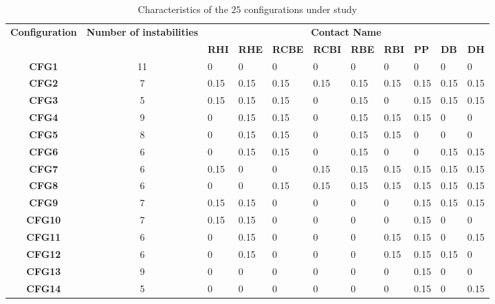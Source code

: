 \documentclass[final,1p]{elsarticle}
\begin{document}
\begin{table}[h!]
\centering
\caption{Characteristics of the $25$ configurations under study}
\small
\hspace*{-3.5cm}
\begin{tabularx}{20cm}{cc*{9}{X}}
\toprule
\multirow{2}{*}{\textbf{Configuration}} &\multirow{2}{2cm}{\textbf{Number of instabilities}} & \multicolumn{9}{c}{\textbf{Contact Name}} \\
 & & 	\textbf{RHI}		&\textbf{RHE}		&\textbf{RCBE}		& \textbf{RCBI}	& 	\textbf{RBE}	& 	\textbf{RBI}		&\textbf{PP}	&\textbf{DB}		&\textbf{ DH} \\
\midrule
\textbf{CFG1}				& 11											&0						&0						&0						&0					&0					&0						&0						&0			&0		\\
\textbf{CFG2}				& 7											&0.15					&0.15					&0.15					&0.15				&0.15				&0.15					&0.15					&0.15		&0.15	\\
\textbf{CFG3}				& 5											&0.15					&0.15					&0.15					&0					&0.15				&0						&0.15					&0.15		&0.15	\\
\textbf{CFG4}				& 9											&0						&0.15					&0.15					&0					&0.15				&0.15					&0.15					&0			&0		\\
\textbf{CFG5}				& 8											&0						&0.15					&0.15					&0					&0.15				&0.15					&0						&0			&0		\\
\textbf{CFG6}				& 6 											&0						&0.15					&0.15					&0					&0.15				&0						&0						&0.15		&0.15	\\
\textbf{CFG7}				& 6 											&0.15					&0						&0						&0.15				&0.15				&0.15					&0.15					&0.15		&0.15	\\
\textbf{CFG8}				& 6											&0						&0						&0.15					&0.15				&0.15				&0.15					&0.15					&0.15		&0.15	\\
\textbf{CFG9}				& 7											&0.15					&0.15					&0						&0					&0					&0						&0.15					&0.15		&0.15	\\
\textbf{CFG10}			& 7											&0.15					&0.15					&0						&0					&0					&0						&0.15					&0			&0		\\
\textbf{CFG11}			& 6											&0						&0.15					&0						&0					&0					&0.15					&0.15					&0			&0.15	\\
\textbf{CFG12}			& 6											&0						&0.15					&0						&0					&0					&0.15					&0.15					&0.15		&0		\\
\textbf{CFG13}			& 9											&0						&0						&0						&0					&0					&0						&0.15					&0			&0		\\
\textbf{CFG14}			& 5											&0						&0						&0						&0					&0					&0						&0.15					&0			&0.15	\\

\end{tabularx}
\end{table}
\end{document}
